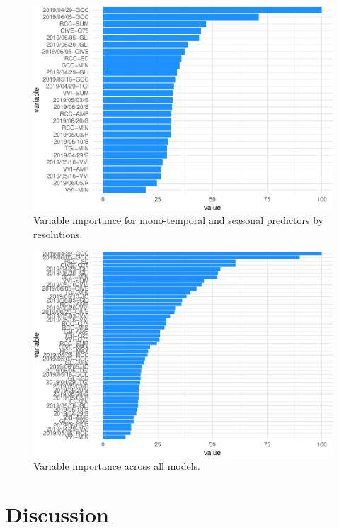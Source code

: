 \documentclass[]{article}
\begin{document}
\begin{figure}[H]

{\centering \includegraphics{report_files/figure-latex/var_imp_all-1} 

}

\caption{Variable importance for mono-temporal and seasonal predictors by resolutions.}\label{fig:var_imp_all}
\end{figure}

\begin{figure}[H]

{\centering \includegraphics{report_files/figure-latex/var_imp_together-1} 

}

\caption{Variable importance across all models.}\label{fig:var_imp_together}
\end{figure}

\hypertarget{discussion}{%
\section{Discussion}\label{discussion}}
\end{document}
